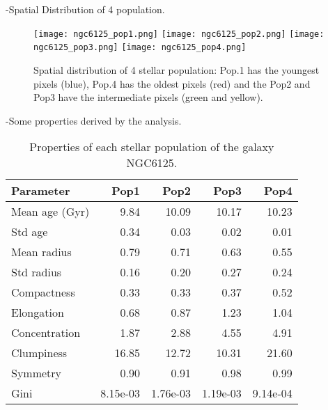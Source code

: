 -Spatial Distribution of 4 population.


\begin{figure}[bh]
\begin{center}
\texttt{[image: ngc6125\_pop1.png]}
\texttt{[image: ngc6125\_pop2.png]}
\texttt{[image: ngc6125\_pop3.png]}
\texttt{[image: ngc6125\_pop4.png]}
 \caption{Spatial distribution of 4 stellar population: Pop.1 has the youngest pixels (blue), Pop.4 has the oldest pixels (red) and the Pop2 and Pop3 have the intermediate pixels (green and yellow).}
   \label{fig1}
\end{center}
\end{figure}

-Some properties derived by the analysis.

\begin{table}[h]
\centering
\begin{tabular}{l|r|r|r|r}
Parameter & Pop1 & Pop2 & Pop3 & Pop4 \\\hline
Mean age (Gyr) & 9.84 & 10.09 & 10.17 & 10.23 \\
Std age & 0.34 & 0.03 & 0.02 & 0.01 \\
Mean radius & 0.79 & 0.71 & 0.63 & 0.55 \\
Std radius & 0.16 & 0.20 & 0.27 & 0.24 \\
Compactness & 0.33 & 0.33 & 0.37 & 0.52 \\
Elongation & 0.68  & 0.87 & 1.23 & 1.04 \\
Concentration & 1.87  & 2.88 & 4.55 & 4.91 \\
Clumpiness & 16.85 & 12.72 & 10.31 & 21.60 \\
Symmetry & 0.90  & 0.91 & 0.98 & 0.99 \\
Gini & 8.15e-03 & 1.76e-03 & 1.19e-03 & 9.14e-04 \\
\end{tabular}
\caption{\label{tab:widgets}Properties of each stellar population of the galaxy NGC6125.}
\end{table}


